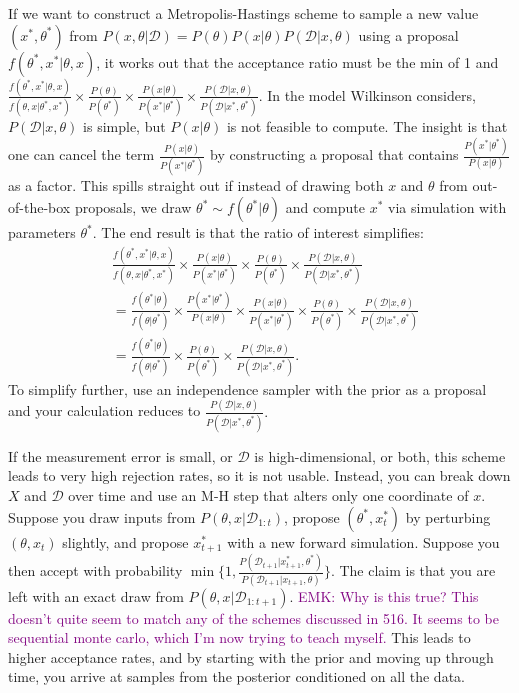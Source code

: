 \documentclass{article}
\newcommand\EMK[1]{\textcolor{purple}{EMK: #1}}
\begin{document}
If we want to construct a Metropolis-Hastings scheme to sample a new value $(x^*, \theta^*)$ from $P(x, \theta|\mathcal{D})=P( \theta)P(x| \theta)P(\mathcal{D}|x, \theta)$ using a proposal $f(\theta^*, x^*|\theta, x)$, it works out that the acceptance ratio must be the min of 1 and $\frac{f(\theta^*, x^*|\theta, x)}{f(\theta, x|\theta^*, x^*)}\times \frac{ P( \theta)}{ P( \theta^*)} \times \frac{P(x| \theta)}{P(x^*| \theta^*)} \times \frac{P(\mathcal{D}|x, \theta)}{P(\mathcal{D}|x^*, \theta^*)}$. In the model Wilkinson considers, $P(\mathcal{D}|x,\theta)$ is simple, but $P(x|\theta)$ is not feasible to compute. The insight is that one can cancel the term $ \frac{P(x| \theta)}{P(x^*| \theta^*)}$ by constructing a proposal that contains  $\frac{P(x^*| \theta^*)}{P(x| \theta)}$ as a factor. This spills straight out if instead of drawing both $x$ and $\theta$ from out-of-the-box proposals, we draw $\theta^*\sim f(\theta^*|\theta)$ and compute $x^*$ via simulation with parameters $\theta^*$. The end result is that the ratio of interest simplifies:
\begin{align*}
&\frac{f(\theta^*, x^*|\theta, x)}{f(\theta, x|\theta^*, x^*)}\times \frac{P(x| \theta)}{P(x^*| \theta^*)}\times \frac{ P( \theta)}{ P( \theta^*)}  \times \frac{P(\mathcal{D}|x, \theta)}{P(\mathcal{D}|x^*, \theta^*)}\\
&=\frac{f(\theta^*|\theta)}{f(\theta|\theta^*)}\times \frac{P(x^*| \theta^*)}{P(x| \theta)} \times \frac{P(x| \theta)}{P(x^*| \theta^*)} \times \frac{ P( \theta)}{ P( \theta^*)}\times \frac{P(\mathcal{D}|x, \theta)}{P(\mathcal{D}|x^*, \theta^*)}\\
&=\frac{f(\theta^*|\theta)}{f(\theta|\theta^*)}\times \frac{ P( \theta)}{ P( \theta^*)}\times \frac{P(\mathcal{D}|x, \theta)}{P(\mathcal{D}|x^*, \theta^*)}.
\end{align*}
To simplify further, use an independence sampler with the prior as a proposal and your calculation reduces to $ \frac{P(\mathcal{D}|x, \theta)}{P(\mathcal{D}|x^*, \theta^*)}.$

If the measurement error is small, or $\mathcal{D}$ is high-dimensional, or both, this scheme leads to very high rejection rates, so it is not usable. Instead, you can break down $X$ and $\mathcal{D}$ over time and use an M-H step that alters only one coordinate of $x$. %
 Suppose you draw inputs from $P(\theta, x|\mathcal{D}_{1:t})$, propose $(\theta^*, x_t^*)$ by perturbing $(\theta, x_t)$ slightly, and propose $x_{t+1}^*$ with a new forward simulation. Suppose you then accept with probability $\min\{1,
\frac{P(\mathcal{D}_{t+1}|x_{t+1}^*, \theta^*)}{P(\mathcal{D}_{t+1}|x_{t+1}, \theta)}\}$. The claim is that you are left with an exact draw from $P(\theta, x|\mathcal{D}_{1:t+1})$. \EMK{Why is this true? This doesn't quite seem to match any of the schemes discussed in 516. It seems to be sequential monte carlo, which I'm now trying to teach myself.} This leads to higher acceptance rates, and by starting with the prior and moving up through time, you arrive at samples from the posterior conditioned on all the data.
\end{document}
